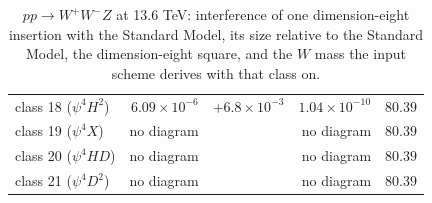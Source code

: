\begin{table}[t]
\begin{tabular}{@{}lrrrr@{}}
class 18 ($\psi^4 H^2$) & $6.09\times 10^{-6}$ & $+6.8\times 10^{-3}$ & $1.04\times 10^{-10}$ & $80.39$\\
class 19 ($\psi^4 X$) & no diagram &  & no diagram & $80.39$\\
class 20 ($\psi^4 H D$) & no diagram &  & no diagram & $80.39$\\
class 21 ($\psi^4 D^2$) & no diagram &  & no diagram & $80.39$\\
\hline\end{tabular}
\caption{$p p \to W^+ W^- Z$ at 13.6 TeV: interference of one dimension-eight insertion with the Standard Model, its size relative to the Standard Model, the dimension-eight square, and the $W$ mass the input scheme derives with that class on.}\label{tab:triboson-wpwmz}\end{table}

